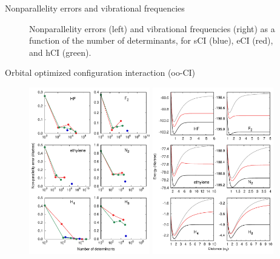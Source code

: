 \documentclass[final]{beamer}
\newlength{\colwidth}
\begin{document}
\begin{frame}[t]
\begin{columns}[t]
\begin{column}{\colwidth}
\begin{block}{Nonparallelity errors and vibrational frequencies}
\begin{figure}
    \caption{Nonparallelity errors (left) and vibrational frequencies (right) as a function of the number of determinants, for sCI (blue), eCI (red), and hCI (green).}
    \label{fig:plot_stat_distance}
  \end{figure}
\end{block}

\vspace{-1.5cm}
\begin{block}{Orbital optimized configuration interaction (oo-CI)}
  \vspace{-0.5cm}
  \begin{figure}
    \includegraphics[width=0.47\textwidth]{fig/plot_stat_opt.pdf}
    \includegraphics[width=0.47\textwidth]{fig/plot_pes_ooCIS.pdf}

\end{figure}
\end{block}
\end{column}
\end{columns}
\end{frame}
\end{document}
